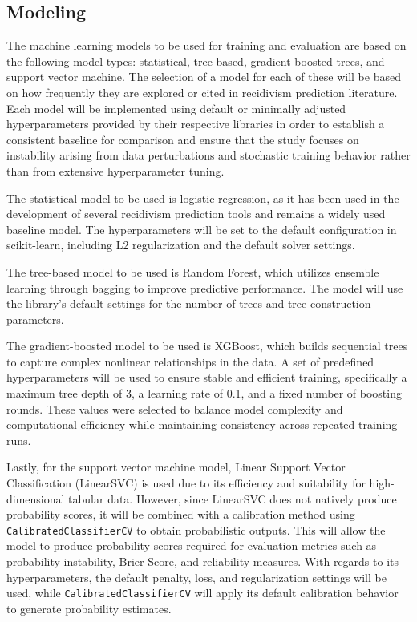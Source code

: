 \documentclass{article}
\begin{document}
\subsection{Modeling}
\tab%
The machine learning models to be used for training and evaluation are based on the following model types: statistical, tree-based, gradient-boosted trees, and support vector machine. The selection of a model for each of these will be based on how frequently they are explored or cited in recidivism prediction literature. Each model will be implemented using default or minimally adjusted hyperparameters provided by their respective libraries in order to establish a consistent baseline for comparison and ensure that the study focuses on instability arising from data perturbations and stochastic training behavior rather than from extensive hyperparameter tuning.

The statistical model to be used is logistic regression, as it has been used in the development of several recidivism prediction tools and remains a widely used baseline model. The hyperparameters will be set to the default configuration in scikit-learn, including L2 regularization and the default solver settings. 

The tree-based model to be used is Random Forest, which utilizes ensemble learning through bagging to improve predictive performance. The model will use the library's default settings for the number of trees and tree construction parameters.

The gradient-boosted model to be used is XGBoost, which builds sequential trees to capture complex nonlinear relationships in the data. A set of predefined hyperparameters will be used to ensure stable and efficient training, specifically a maximum tree depth of 3, a learning rate of 0.1, and a fixed number of boosting rounds. These values were selected to balance model complexity and computational efficiency while maintaining consistency across repeated training runs. 

Lastly, for the support vector machine model, Linear Support Vector Classification (LinearSVC) is used due to its efficiency and suitability for high-dimensional tabular data. However, since LinearSVC does not natively produce probability scores, it will be combined with a calibration method using \texttt{CalibratedClassifierCV} to obtain probabilistic outputs. This will allow the model to produce probability scores required for evaluation metrics such as probability instability, Brier Score, and reliability measures. With regards to its hyperparameters, the default penalty, loss, and regularization settings will be used, while \texttt{CalibratedClassifierCV} will apply its default calibration behavior to generate probability estimates.
\end{document}
